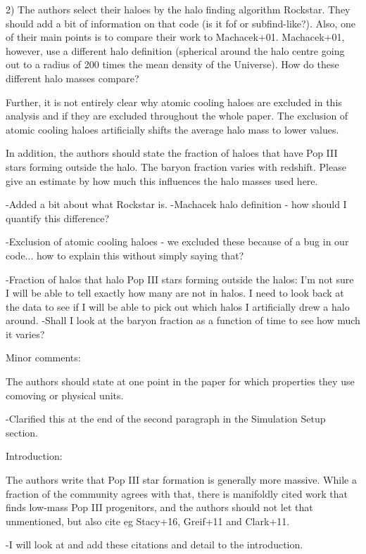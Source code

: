 \documentclass[11pt]{article}
\newenvironment{referee}[1][]{%
    \ignorespaces%
    \begin{mdframed}[style=myquotestyle,#1]%
}{%
    \end{mdframed}%
    \ignorespacesafterend%
}%
\begin{document}
\begin{referee}
2) The authors select their haloes by the halo finding algorithm Rockstar. They should add a bit of information on that code (is it fof or subfind-like?). Also, one of their main points is to compare their work to Machacek+01. Machacek+01, however, use a different halo definition (spherical around the halo centre going out to a radius of 200 times the mean density of the Universe). How do these different halo masses compare?

Further, it is not entirely clear why atomic cooling haloes are excluded in this analysis and if they are excluded throughout the whole paper. The exclusion of atomic cooling haloes artificially shifts the average halo mass to lower values.

In addition, the authors should state the fraction of haloes that have Pop III stars forming outside the halo. The baryon fraction varies with redshift. Please give an estimate by how much this influences the halo masses used here.
\end{referee}

-Added a bit about what Rockstar is. 
-Machacek halo definition - how should I quantify this difference? 

-Exclusion of atomic cooling haloes - we excluded these because of a bug in our code... how to explain this without simply saying that?

-Fraction of halos that halo Pop III stars forming outside the halos: I'm not sure I will be able to tell exactly how many are not in halos. I need to look back at the data to see if I will be able to pick out which halos I artificially drew a halo around. 
-Shall I look at the baryon fraction as a function of time to see how much it varies? 

\begin{referee}
Minor comments:

The authors should state at one point in the paper for which properties they use comoving or physical units.
\end{referee}
-Clarified this at the end of the second paragraph in the Simulation Setup section.

\begin{referee}
Introduction:

The authors write that Pop III star formation is generally more massive. While a fraction of the community agrees with that, there is manifoldly cited work that finds low-mass Pop III progenitors, and the authors should not let that unmentioned, but also cite eg Stacy+16, Greif+11 and Clark+11.
\end{referee}
-I will look at and add these citations and detail to the introduction.
\end{document}
